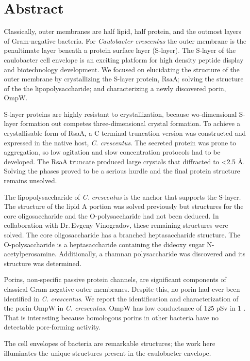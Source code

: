 
\chapter{Abstract}

Classically, outer membranes are half lipid, half protein, and the outmost
layers of Gram-negative bacteria. For \textit{Caulobacter crescentus} the outer
membrane is the penultimate layer beneath a protein surface layer (S-layer). The
S-layer of the caulobacter cell envelope is an exciting platform for high
density peptide display and biotechnology development. We focused on elucidating
the structure of the outer membrane by crystallizing the S-layer protein, RsaA; solving the structure of the the lipopolysaccharide; and characterizing a newly discovered porin, OmpW. 

S-layer proteins are highly resistant to crystallization, because wo-dimensional
S-layer formation out competes three-dimensional crystal formation. To achieve a
crystallisable form of RsaA, a C-terminal truncation version was constructed and
expressed in the native host, \textit{C. crescentus}. The secreted protein was
prone to aggregation, so low agitation and slow concentration protocols had to
be developed. The RsaA truncate produced large crystals that diffracted to <2.5
\AA. Solving the phases proved to be a serious hurdle and the final protein structure remains unsolved.

The lipopolysaccharide of \textit{C. crescentus} is the anchor that supports the
S-layer. The structure of the lipid A portion was solved previously but
structures for the core oligosaccharide and the O-polysaccharide had not been deduced. In collaboration with Dr.\,Evgeny
Vinogradov, these remaining structures were solved.
The core oligosaccharide has a branched heptasaccharide structure. The O-polysaccharide is a heptasaccharide containing the dideoxy sugar N-acetylperosamine. Additionally, a rhamnan polysaccharide was discovered and its structure was determined. 

Porins, non-specific passive protein channels, are significant components of classical Gram-negative outer membranes. Despite this, no porin had ever been identified in \textit{C. crescentus}. We report the identification and characterization of the porin OmpW in \textit{C. crescentus}.  OmpW has low conductance of 125 pSv in 1 \si{\molar} . That is interesting because homologous porins in other bacteria have no detectable pore-forming activity.

The cell envelopes of bacteria are remarkable structures; the work here illuminates the unique structures present in the caulobacter envelope.
